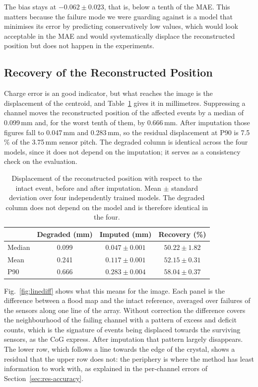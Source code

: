\documentclass[10pt,conference]{IEEEtran}
\begin{document}
The bias stays at $-0.062 \pm 0.023$, that is, below a tenth of the MAE. This
matters because the failure mode we were guarding against is a model that
minimises its error by predicting conservatively low values, which would look
acceptable in the MAE and would systematically displace the reconstructed
position but does not happen in the experiments. 
\subsection{Recovery of the Reconstructed Position}
\label{sec:res-position}

Charge error is an good indicator, but what reaches the image is the
displacement of the centroid, and Table~\ref{tab:position} gives it in
millimetres. Suppressing a channel moves the reconstructed position of the
affected events by a median of 0.099\,mm and, for the worst tenth of them, by
0.666\,mm. After imputation those figures fall to 0.047\,mm and 0.283\,mm, so
the residual displacement at P90 is 7.5\,\% of the 3.75\,mm sensor pitch. The
degraded column is identical across the four models, since it
does not depend on the imputation; it serves as a consistency check on the
evaluation.

\begin{table}[t]
\centering
\caption{Displacement of the reconstructed position with respect to the intact
event, before and after imputation. Mean $\pm$ standard deviation over four
independently trained models. The degraded column does not depend on the model
and is therefore identical in the four.}
\label{tab:position}
\begin{tabular}{@{}lccc@{}}
\toprule
 & \textbf{Degraded (mm)} & \textbf{Imputed (mm)} & \textbf{Recovery (\%)} \\
\midrule
Median & 0.099 & $0.047 \pm 0.001$ & $50.22 \pm 1.82$ \\
Mean   & 0.241 & $0.117 \pm 0.001$ & $52.15 \pm 0.31$ \\
P90    & 0.666 & $0.283 \pm 0.004$ & $58.04 \pm 0.37$ \\
\bottomrule
\end{tabular}
\end{table}

Fig.~\ref{fig:linediff} shows what this means for the image. Each panel is the
difference between a flood map and the intact reference, averaged over failures
of the sensors along one line of the array. Without correction the difference
covers the neighbourhood of the failing channel with a pattern of excess and
deficit counts, which is the signature of events being displaced towards the
surviving sensors, as the CoG express. After imputation that pattern largely disappears. The lower
row, which follows a line towards the edge of the crystal, shows a residual
that the upper row does not: the periphery is where the method has least
information to work with, as explained in the per-channel errors of
Section~\ref{sec:res-accuracy}.
\end{document}
